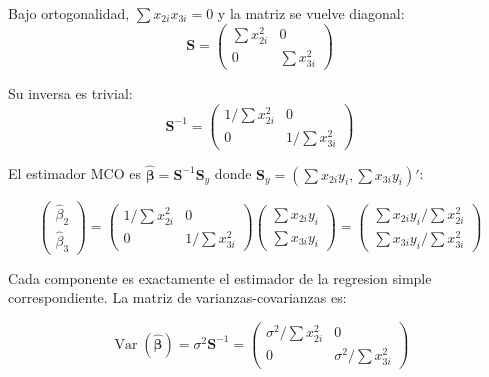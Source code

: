 \documentclass[12pt, letterpaper]{article}
\theoremstyle{remark}
\newcommand{\Var}{\operatorname{Var}}
\begin{document}
Bajo ortogonalidad, $\sum x_{2i}x_{3i} = 0$ y la matriz se vuelve diagonal:
\begin{equation}
  \mathbf{S} =
  \begin{pmatrix}
    \sum x_{2i}^2 & 0\\
    0 & \sum x_{3i}^2
  \end{pmatrix}
  \label{eq:S_diag}
\end{equation}

Su inversa es trivial:
\begin{equation}
  \mathbf{S}^{-1} =
  \begin{pmatrix}
    1/\sum x_{2i}^2 & 0\\
    0 & 1/\sum x_{3i}^2
  \end{pmatrix}
  \label{eq:Sinv}
\end{equation}

El estimador MCO es $\hat{\boldsymbol\beta} = \mathbf{S}^{-1}\mathbf{S}_{y}$
donde $\mathbf{S}_y = (\sum x_{2i}y_i, \sum x_{3i}y_i)'$:

\begin{equation}
  \begin{pmatrix}\hat\beta_2\\\hat\beta_3\end{pmatrix}
  =
  \begin{pmatrix}
    1/\sum x_{2i}^2 & 0\\
    0 & 1/\sum x_{3i}^2
  \end{pmatrix}
  \begin{pmatrix}\sum x_{2i}y_i\\\sum x_{3i}y_i\end{pmatrix}
  =
  \begin{pmatrix}
    \sum x_{2i}y_i/\sum x_{2i}^2\\
    \sum x_{3i}y_i/\sum x_{3i}^2
  \end{pmatrix}
  \label{eq:betahat_diag}
\end{equation}

Cada componente es exactamente el estimador de la regresion simple correspondiente.
La matriz de varianzas-covarianzas es:

\begin{equation}
  \Var(\hat{\boldsymbol\beta}) = \sigma^2 \mathbf{S}^{-1} =
  \begin{pmatrix}
    \sigma^2/\sum x_{2i}^2 & 0\\
    0 & \sigma^2/\sum x_{3i}^2
  \end{pmatrix}
  \label{eq:varmat}
\end{equation}
\end{document}
